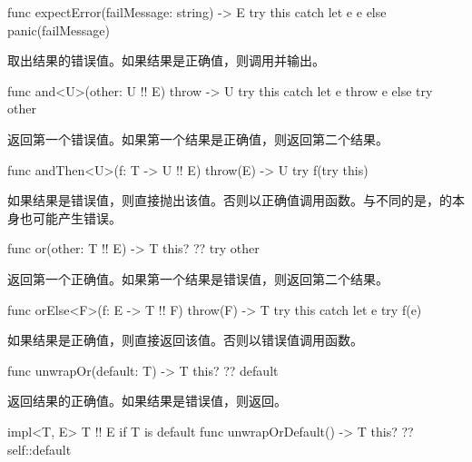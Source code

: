 \begin{itemdecl}
func expectError(failMessage: string) -> E {
    try this catch let e { e } else { panic(failMessage) }
}
\end{itemdecl}

\pnum
{}取出结果的错误值。如果结果是正确值，则调用并输出。

\begin{itemdecl}
func and<U>(other: U !! E) throw -> U {
    try this catch let e { throw e } else { try other }
}
\end{itemdecl}

\pnum
{}返回第一个错误值。如果第一个结果是正确值，则返回第二个结果。

\begin{itemdecl}
func andThen<U>(f: T -> U !! E) throw(E) -> U {
    try f(try this)
}
\end{itemdecl}

\pnum
如果结果是错误值，则直接抛出该值。否则以正确值调用函数。\enternote 与不同的是，的本身也可能产生错误。\exitnote

\begin{itemdecl}
func or(other: T !! E) -> T {
    this? ?? try other
}
\end{itemdecl}

\pnum
{}返回第一个正确值。如果第一个结果是错误值，则返回第二个结果。

\begin{itemdecl}
func orElse<F>(f: E -> T !! F) throw(F) -> T {
    try this catch let e { try f(e) }
}
\end{itemdecl}

\pnum
如果结果是正确值，则直接返回该值。否则以错误值调用函数。

\begin{itemdecl}
func unwrapOr(default: T) -> T {
    this? ?? default
}
\end{itemdecl}

\pnum
{}返回结果的正确值。如果结果是错误值，则返回。

\begin{itemdecl}
impl<T, E> T !! E if T is default {
    func unwrapOrDefault() -> T {
        this? ?? self::default
    }
}
\end{itemdecl}

